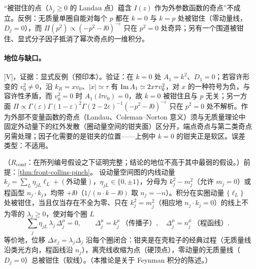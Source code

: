 \begin{proposition}\label{prop:front-landau-not-singular}
“被钳住的点（$\lambda_j\ge0$ 的 Landau 点）蕴含 $I(z)$ 作为外参数函数的奇点”不成立。反例：无质量单圈自能对每个 $p$ 都在 $k=0$ 与 $k=p$ 处被钳住（零动量线，$D_j=0$），而 $\Pi(p^2)\propto(-p^2-\ii0)^{-\varepsilon}$ 只在 $p^2=0$ 处奇异\cite[附录~D.1]{Collins:2020euz}；另有一个围道被钳住、显式分子因子抵消了幂次奇点的一维积分\cite[附录~A]{Collins:2020euz}。
\end{proposition}

\paragraph{地位与缺口。}[V]，证据：显式反例（预印本）。验证：在 $k=0$ 处 $A_1=k^2$、$D_1=0$；若容许形变的 $v_0^2\ne0$，沿 $k_R=xv_0$、$|x|\simeq\tau$ 有 $\operatorname{Im} A_1\simeq2x\tau v_0^2$，对 $x$ 的一种符号为负，与容许性矛盾，而 $v_0^2=0$ 时 $A_1(\ii\tau v_0)=0$，故 $k=0$ 被钳住且与 $p$ 无关；另一方面 $\Pi\propto\Gamma(\varepsilon)\Gamma(1-\varepsilon)^2\Gamma(2-2\varepsilon)^{-1}(-p^2-\ii0)^{-\varepsilon}$ 只在 $p^2=0$ 处不解析。作为外部不变量函数的奇点（Landau、Coleman--Norton 意义）须与无质量理论中固定外动量下的红外发散（圈动量空间的钳夹面）区分开，端点奇点与第二类奇点另需处理；因子化需要的是钳夹的位置——上例中 $k=0$ 的钳夹正是软区。误差类型：不适用。

\begin{corollary}\label{cor:front-coleman-norton}
（$R_{\mathrm{cond}}$：在所列编号假设之下证明完整；结论的地位不高于其中最弱的假设。）前提：\cref{thm:front-collins-pinch}。
设动量空间图的内线动量 $k_j=\sum_L\eta_{jL}\ell_L+(\text{外动量})$，$\eta_{jL}\in\{0,\pm1\}$，分母为 $k_j^2-m_j^2$（允许 $m_j=0$）或程函型 $n_j\cdot k_j$，均带 $+\ii0$（$1/(n\cdot k-\ii0)$ 取 $n_j=-n$）。积分在实圈动量 $\{\ell_L\}$ 处被钳住，当且仅当存在不全为零、只在 $k_j^2=m_j^2$（相应地 $n_j\cdot k_j=0$）的线上不为零的 $\lambda_j\ge0$，使对每个圈 $L$
\begin{equation}\label{eq:front-cn}
\sum_j\eta_{jL}\,\lambda_j\,\Delta_j^\mu=0,\qquad
\Delta_j^\mu=k_j^\mu\ \text{（传播子）},\quad \Delta_j^\mu=n_j^\mu\ \text{（程函线）}.
\end{equation}
等价地，位移 $\Delta x_j=\lambda_j\Delta_j$ 沿每个圈闭合：钳夹是在壳粒子的经典过程（无质量线沿类光方向，程函线沿 $n_j$），离壳线收缩为点（硬顶点），零动量的无质量线（$D_j=0$）总被钳住（软线）。（本推论是关于 Feynman 积分的陈述。）
\end{corollary}

